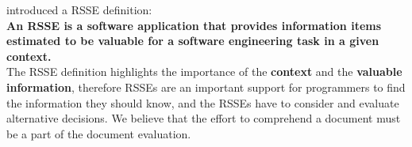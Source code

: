 \documentclass[12pt,mscthesis]{usiinfthesis}
\begin{document}



	 \citet{RecommendationSystemsforSoftwareEngineering} introduced a RSSE definition:\\

	\textbf{An RSSE is a software application that provides information items estimated to be valuable for a software engineering task in a given context.}\\

	The RSSE definition highlights the importance of the \textbf{context} and the \textbf{valuable information}, therefore RSSEs are an important support for programmers to find the information they should know, and the RSSEs have to consider and evaluate alternative decisions. We believe that the effort to comprehend a document must be a part of the document evaluation.\\
\end{document}
